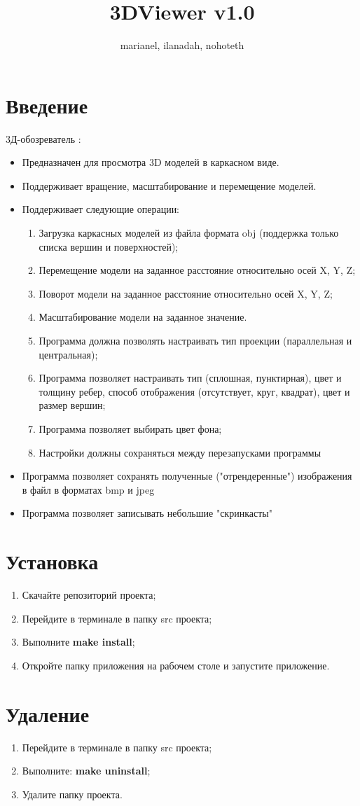\documentclass{article}
\title{3DViewer v1.0}
\author{marianel, ilanadah, nohoteth}
\begin{document}
\maketitle

\section{Введение}
3Д-обозреватель :
    \begin{itemize}
        \item Предназначен для просмотра 3D моделей в каркасном виде.
        \item Поддерживает вращение, масштабирование и перемещение моделей.
        \item Поддерживает следующие операции:
        \begin{enumerate}
            \item Загрузка каркасных моделей из файла формата obj (поддержка только списка вершин и поверхностей);
            \item Перемещение модели на заданное расстояние относительно осей X, Y, Z;
            \item Поворот модели на заданное расстояние относительно осей X, Y, Z;
            \item Масштабирование модели на заданное значение.
            \item Программа должна позволять настраивать тип проекции (параллельная и центральная);
            \item Программа позволяет настраивать тип (сплошная, пунктирная), цвет и толщину ребер, способ отображения (отсутствует, круг, квадрат), цвет и размер вершин;
            \item Программа позволяет выбирать цвет фона;
            \item Настройки должны сохраняться между перезапусками программы
        \end{enumerate}
        \item Программа позволяет сохранять полученные ("отрендеренные") изображения в файл в форматах bmp и jpeg
        \item Программа позволяет записывать небольшие "скринкасты" 
    \end{itemize}

\section{Установка}

\begin{enumerate}
    \item Скачайте репозиторий проекта;
    \item Перейдите в терминале в папку src проекта;
    \item Выполните \textbf{make install};
    \item Откройте папку приложения на рабочем столе и запустите приложение.
\end{enumerate}

\section{Удаление}

\begin{enumerate}
    \item Перейдите в терминале в папку src проекта;
    \item Выполните: \textbf{make uninstall};
    \item Удалите папку проекта.
\end{enumerate}
\end{document}
